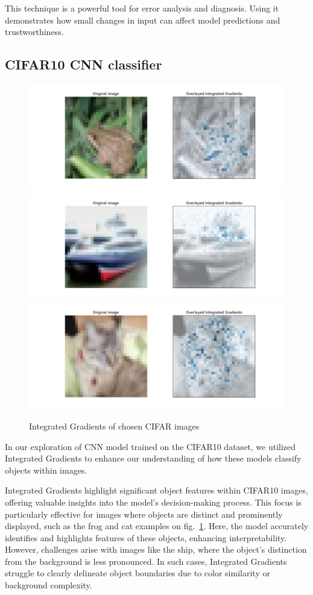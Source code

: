 \documentclass[journal, a4paper]{IEEEtran}
\begin{document}
This technique is a powerful tool for error analysis and diagnosis.
Using it demonstrates how small changes in input can affect model predictions and trustworthiness.

\subsection{CIFAR10 CNN classifier}\label{subsec:experiment-cifar}

\begin{figure}[ht]\centering
    \includegraphics[width=.6\linewidth]{img/integrated_grad/cifar_CNN/frog}
    \includegraphics[width=.6\linewidth]{img/integrated_grad/cifar_CNN/ship}
    \includegraphics[width=.6\linewidth]{img/integrated_grad/cifar_CNN/cat2}
    \caption{Integrated Gradients of chosen CIFAR images}\label{fig:cifar-cnn-int-grad}
\end{figure}
In our exploration of CNN model trained on the CIFAR10 dataset, we utilized Integrated Gradients to enhance our understanding of how these models classify objects within images.

Integrated Gradients highlight significant object features within CIFAR10 images, offering valuable insights into the model's decision-making process.
This focus is particularly effective for images where objects are distinct and prominently displayed, such as the frog and cat examples on fig.~\ref{fig:cifar-cnn-int-grad}.
Here, the model accurately identifies and highlights features of these objects, enhancing interpretability.
However, challenges arise with images like the ship, where the object’s distinction from the background is less pronounced.
In such cases, Integrated Gradients struggle to clearly delineate object boundaries due to color similarity or background complexity.
\end{document}
